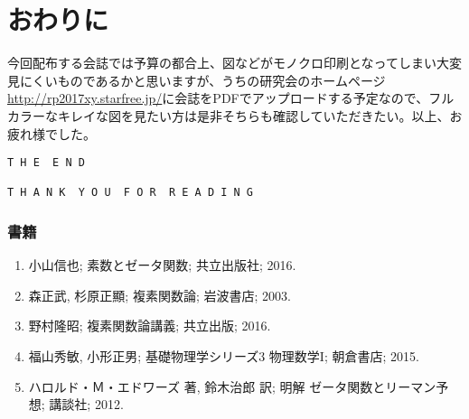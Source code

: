 \documentclass[11pt,b5paper,papersize,dvipdfmx]{jsbook}
\begin{document}





\section*{おわりに}
今回配布する会誌では予算の都合上、図などがモノクロ印刷となってしまい大変見にくいものであるかと思いますが、うちの研究会のホームページ\url{http://rp2017xy.starfree.jp/}に会誌をPDFでアップロードする予定なので、フルカラーなキレイな図を見たい方は是非そちらも確認していただきたい。以上、お疲れ様でした。

\vspace{4zw}
\begin{center}
  \verb|T H E  E N D|\\
  \verb| |\\
  \verb|T H A N K  Y O U  F O R  R E A D I N G|
\end{center}



\clearpage

\sanko
\subsubsection*{書籍}
\begin{enumerate}
  \item 小山信也; 素数とゼータ関数; 共立出版社; 2016.
  \item 森正武, 杉原正顯; 複素関数論; 岩波書店; 2003.
  \item 野村隆昭; 複素関数論講義; 共立出版; 2016.
  \item 福山秀敏, 小形正男; 基礎物理学シリーズ3 物理数学I; 朝倉書店; 2015.
  \item ハロルド・Ｍ・エドワーズ 著, 鈴木治郎 訳; 明解 ゼータ関数とリーマン予想; 講談社; 2012.
\end{enumerate}
\end{document}
